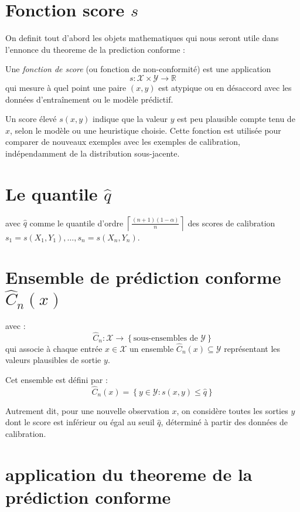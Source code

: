 \documentclass[a4paper,12pt]{article}%
\begin{document}
\section{Fonction score $s$} 


On definit tout d'abord les objets mathematiques qui  nous seront utile dans l'ennonce du theoreme de la prediction conforme : 

Une \emph{fonction de score} (ou fonction de non-conformité) est une application
\[
s : \mathcal{X} \times \mathcal{Y} \rightarrow \mathbb{R}
\]
qui mesure à quel point une paire $(x, y)$ est atypique ou en désaccord avec les données d'entraînement ou le modèle prédictif.

Un score élevé $s(x, y)$ indique que la valeur $y$ est peu plausible compte tenu de $x$, selon le modèle ou une heuristique choisie. Cette fonction est utilisée pour comparer de nouveaux exemples avec les exemples de calibration, indépendamment de la distribution sous-jacente.
\section{ Le quantile $\hat{q}$}
     avec $\hat{q}$ comme le quantile d'ordre $\left\lceil \frac{(n+1)(1 - \alpha)}{n} \right\rceil$ des scores de calibration $s_1 = s(X_1, Y_1), \dots, s_n = s(X_n, Y_n)$.
\section{Ensemble de prédiction conforme $\hat{C}_n(x)$}


    avec : 
    \[
    \hat{C}_n : \mathcal{X} \rightarrow \left\{ \text{sous-ensembles de } \mathcal{Y} \right\}
    \]
    qui associe à chaque entrée $x \in \mathcal{X}$ un ensemble $\hat{C}_n(x) \subseteq \mathcal{Y}$ représentant les valeurs plausibles de sortie $y$.
    
    Cet ensemble est défini par :
    \[
    \hat{C}_n(x) = \left\{ y \in \mathcal{Y} : s(x, y) \leq \hat{q} \right\}
    \]
    
    Autrement dit, pour une nouvelle observation $x$, on considère toutes les sorties $y$ dont le score est inférieur ou égal au seuil $\hat{q}$, déterminé à partir des données de calibration. 



\section{application du theoreme de la prédiction conforme}
\end{document}
